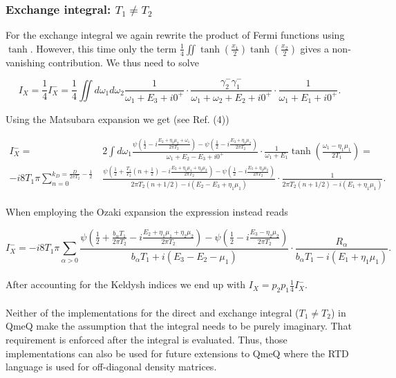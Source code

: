 \documentclass{article}
\begin{document}
\subsubsection{Exchange integral: $T_1\ne T_2$}

For the exchange integral we again rewrite the product of Fermi functions using $\tanh$. However, this time only the term $\frac{1}{4}\iint \tanh\left(\frac{x_1}{2}\right)\tanh\left(\frac{x_2}{2}\right)$ gives a non-vanishing contribution. We thus need to solve

\begin{equation}
    I_X =\frac{1}{4}I_X^- = \frac{1}{4}\iint d\omega_1d\omega_2\frac{1}{\omega_1 + E_3 + i0^+}\cdot\frac{\gamma^-_2\gamma^-_1}{\omega_1 + \omega_2 + E_2 + i0^+}\cdot\frac{1}{\omega_1+E_1+i0^+}.
\end{equation}

Using the Matsubara expansion we get (see Ref. (4))

\begin{equation}
\begin{split}
    I_X^-=&2\int d\omega_1 \frac{\psi\left( \frac{1}{2}-i\frac{E_2+\eta_2\mu_2+\omega_1}{2\pi T_2}\right)-\psi\left( \frac{1}{2}-i\frac{E_3+\eta_2\mu_2}{2\pi T_2}\right)}{\omega_1 + E_2-E_3+i0^+}\cdot\frac{1}{\omega_1+E_1}\tanh\left(\frac{\omega_1-\eta_1\mu_1}{2T_1} \right) = \\ 
    -i8T_1\pi\sum_{n=0}^{k_D=\frac{D}{2\pi T_2}-\frac{1}{2}}&\frac{\psi\left ( \frac{1}{2}+\frac{T_1}{T_2}\left(n+\frac{1}{2} \right)-i\frac{E_2+\eta_1\mu_1+\eta_2\mu_2}{2\pi T_2} \right ) - \psi\left( \frac{1}{2} -i\frac{E_3+\eta_2\mu_2}{2\pi T_2} \right )}{2\pi T_2(n+1/2)-i(E_2-E_3+\eta_1\mu_1)}\cdot\frac{1}{2\pi T_2 (n+1/2)-i(E_1+\eta_1\mu_1)}.
    \end{split}
\end{equation}
\\
When employing the Ozaki expansion the expression instead reads

\begin{equation}
I_X^- =-i8T_1\pi\sum_{\alpha>0} \frac{\psi\left ( \frac{1}{2} + \frac{b_\alpha T_1}{2\pi T_2}-i\frac{E_2+\eta_1\mu_1+ \eta_2\mu_2}{2\pi T_2} \right ) - \psi\left ( \frac{1}{2} - i\frac{E_3-\eta_2\mu_2}{2\pi T_2}\right ) }{b_\alpha T_1 + i(E_3-E_2-\mu_1)}\cdot\frac{R_\alpha}{b_\alpha T_1 - i(E_1+\eta_1\mu_1)}.
\end{equation}
\\
After accounting for the Keldysh indices we end up with $I_X = p_2p_1\frac{1}{4}I_X^-$.
\\
\\
Neither of the implementations for the direct and exchange integral ($T_1\ne T_2$) in QmeQ make the assumption that the integral needs to be purely imaginary. That requirement is enforced after the integral is evaluated. Thus, those implementations can also be used for future extensions to QmeQ where the RTD language is used for off-diagonal density matrices.
\end{document}
